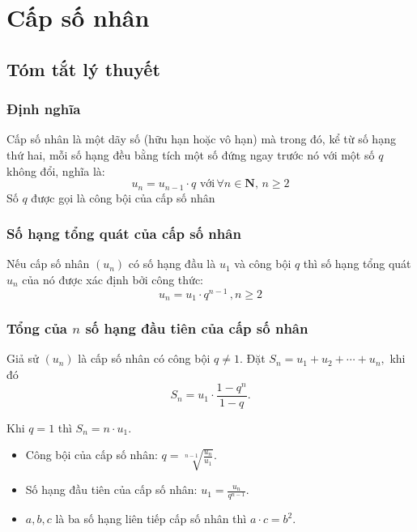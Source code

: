 \setcounter{section}{6}
\setcounter{dang}{0}
\setcounter{ex}{0}
\setcounter{bt}{0}
\setcounter{vd}{0}
\section{Cấp số nhân}
\subsection{Tóm tắt lý thuyết}
\begin{tomtat}
	\subsubsection{Định nghĩa} 
	Cấp số nhân là một dãy số (hữu hạn hoặc vô hạn) mà trong đó, kể từ số hạng thứ hai, mỗi số hạng đều bằng tích một số đứng ngay trước nó với một số $ q $ không đổi, nghĩa là:
	$$ u_{n}=u_{n-1}\cdot q\,\,\text{với}\,\forall n\in \mathbf{N}{,}\,n\ge 2 $$
	Số $ q $ được gọi là công bội của cấp số nhân
	\subsubsection{Số hạng tổng quát của cấp số nhân}
	Nếu cấp số nhân $ (u_n) $ có số hạng đầu là $ u_1 $ và công bội $ q $ thì số hạng tổng quát $ u_n $ của nó được xác định bởi công thức:
	$$u_n = u_1 \cdot q^{n-1}\,,n\ge 2$$
	\subsubsection{Tổng của $ n $ số hạng đầu tiên của cấp số nhân}
	Giả sử $ (u_n) $ là cấp số nhân có công bội $ q\ne 1 $. Đặt $ S_n=u_1+u_2+\cdots +u_n, $ khi đó
	$$S_n = u_1\cdot\frac{1-q^n}{1-q}.$$
	\begin{note}
		Khi $ q=1 $ thì $ S_n=n\cdot u_1 $.
	\end{note}	
	\begin{itemize}
		\item Công bội của cấp số nhân: $q = \sqrt[n-1]{\frac{u_n}{u_1}}$.
		\item Số hạng đầu tiên của cấp số nhân: $u_1 = \frac{u_n}{q^{n-1}}$.
		\item $ a,b,c $ là ba số hạng liên tiếp cấp số nhân thì $ a\cdot c=b^2 $. 
	\end{itemize}	
\end{tomtat}
